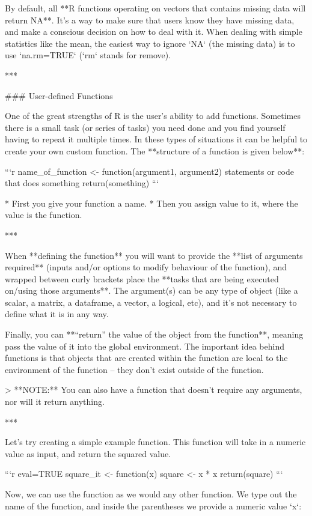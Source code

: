{{By default, all **R functions operating on vectors that contains missing data will return NA**. It's a way to make sure that users know they have missing data, and make a conscious decision on how to deal with it. When dealing with simple statistics like the mean, the easiest way to ignore `NA` (the missing data) is to use `na.rm=TRUE` (`rm` stands for remove).

***

### User-defined Functions

One of the great strengths of R is the user's ability to add functions. Sometimes there is a small task (or series of tasks) you need done and you find yourself having to repeat it multiple times. In these types of situations it can be helpful to create your own custom function. The **structure of a function is given below**:

```r
name_of_function <- function(argument1, argument2) {
    statements or code that does something
    return(something)
}
```

* First you give your function a name. 
* Then you assign value to it, where the value is the function. 

***

When **defining the function** you will want to provide the **list of arguments required** (inputs and/or options to modify behaviour of the function), and wrapped between curly brackets place the **tasks that are being executed on/using those arguments**.  The argument(s) can be any type of object (like a scalar, a matrix, a dataframe, a vector, a logical, etc), and it’s not necessary to define what it is in any way. 

Finally, you can **“return” the value of the object from the function**, meaning pass the value of it into the global environment. The important idea behind functions is that objects that are created within the function are local to the environment of the function – they don’t exist outside of the function. 

> **NOTE:** You can also have a function that doesn't require any arguments, nor will it return anything.

***

Let's try creating a simple example function. This function will take in a numeric value as input, and return the squared value.

```{r eval=TRUE}
square_it <- function(x) {
    square <- x * x
    return(square)
}
```

Now, we can use the function as we would any other function. We type out the name of the function, and inside the parentheses  we provide a numeric value `x`:

}}
